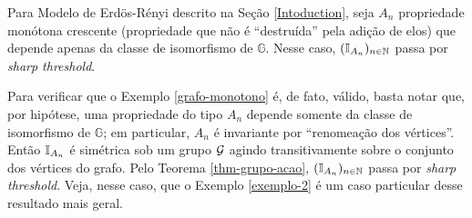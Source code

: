 \begin{myexp} \label{grafo-monotono}
	Para Modelo de Erd\"os-Rényi descrito na Seção \ref{Intoduction}, seja $A_n$ propriedade monótona crescente (propriedade que não é ``destruída'' pela adição de elos) que depende apenas da classe de isomorfismo de $\mathbb{G}$. Nesse caso, $(\operatorname{\mathbb{I}}_{A_n})_{n \in \operatorname{\mathbb{N}}}$ passa por \textit{sharp threshold}.
\end{myexp}

\par Para verificar que o Exemplo \ref{grafo-monotono} é, de fato, válido, basta notar que, por hipótese, uma propriedade do tipo $A_n$ depende somente da classe de isomorfismo de $\mathbb{G}$; em particular, $A_n$ é invariante por ``renomeação dos vértices''. Então $\operatorname{\mathbb{I}}_{A_n}$ é simétrica sob um grupo $\operatorname{\mathcal{G}}$ agindo transitivamente sobre o conjunto dos vértices do grafo. Pelo Teorema \ref{thm-grupo-acao}, $(\operatorname{\mathbb{I}}_{A_n})_{n \in \operatorname{\mathbb{N}}}$ passa por \textit{sharp threshold}. Veja, nesse caso, que o Exemplo \ref{exemplo-2} é um caso particular desse resultado mais geral.